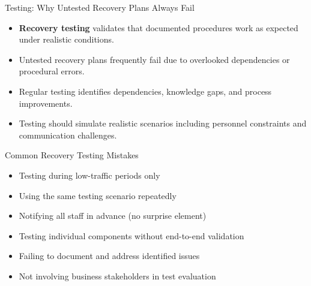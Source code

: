 \documentclass{beamer}
\begin{document}
\begin{frame}{Testing: Why Untested Recovery Plans Always Fail}
    \begin{itemize}
        \item \textbf{Recovery testing} validates that documented procedures work as expected under realistic conditions.
        \item Untested recovery plans frequently fail due to overlooked dependencies or procedural errors.
        \item Regular testing identifies dependencies, knowledge gaps, and process improvements.
        \item Testing should simulate realistic scenarios including personnel constraints and communication challenges.
    \end{itemize}
    
    \begin{alertblock}{Common Recovery Testing Mistakes}
        \scriptsize
        \begin{itemize}
            \item Testing during low-traffic periods only
            \item Using the same testing scenario repeatedly
            \item Notifying all staff in advance (no surprise element)
            \item Testing individual components without end-to-end validation
            \item Failing to document and address identified issues
            \item Not involving business stakeholders in test evaluation
        \end{itemize}
    \end{alertblock}
\end{frame}
\end{document}
